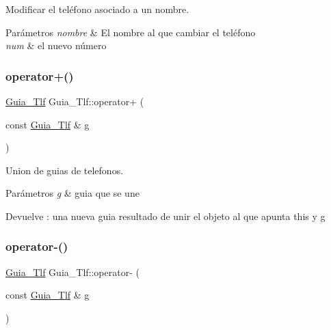 Modificar el teléfono asociado a un nombre. 


\begin{DoxyParams}{Parámetros}
{\em nombre} & El nombre al que cambiar el teléfono \\
\hline
{\em num} & el nuevo número \\
\hline
\end{DoxyParams}
\mbox{\label{classGuia__Tlf_a3e0b08a1985d3c72853690730319172f}} 
\subsubsection{\texorpdfstring{operator+()}{operator+()}}
{\footnotesize\ttfamily \hyperlink{classGuia__Tlf}{Guia\+\_\+\+Tlf} Guia\+\_\+\+Tlf\+::operator+ (\begin{DoxyParamCaption}\item[{const \hyperlink{classGuia__Tlf}{Guia\+\_\+\+Tlf} \&}]{g }\end{DoxyParamCaption})\hspace{0.3cm}{\ttfamily [inline]}}



Union de guias de telefonos. 


\begin{DoxyParams}{Parámetros}
{\em g} & guia que se une \\
\hline
\end{DoxyParams}
\begin{DoxyReturn}{Devuelve}
\+: una nueva guia resultado de unir el objeto al que apunta this y g 
\end{DoxyReturn}
\mbox{\label{classGuia__Tlf_ac381d53f275ce769830e07fbc56902b0}} 
\subsubsection{\texorpdfstring{operator-\/()}{operator-()}}
{\footnotesize\ttfamily \hyperlink{classGuia__Tlf}{Guia\+\_\+\+Tlf} Guia\+\_\+\+Tlf\+::operator-\/ (\begin{DoxyParamCaption}\item[{const \hyperlink{classGuia__Tlf}{Guia\+\_\+\+Tlf} \&}]{g }\end{DoxyParamCaption})\hspace{0.3cm}{\ttfamily [inline]}}



